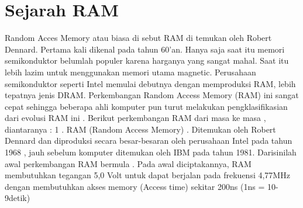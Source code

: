 \section{Sejarah RAM}
Random Acces Memory atau biasa di sebut RAM di temukan oleh Robert Dennard.
Pertama kali dikenal pada tahun 60'an. Hanya saja saat itu memori semikonduktor belumlah populer karena harganya yang sangat mahal. Saat itu lebih lazim untuk menggunakan memori utama magnetic. Perusahaan semikonduktor seperti Intel memulai debutnya dengan memproduksi RAM, lebih tepatnya jenis DRAM.
Perkembangan Random Access Memory (RAM) ini sangat cepat sehingga beberapa ahli komputer pun turut melakukan pengklasifikasian dari evolusi RAM ini . 
Berikut perkembangan RAM dari masa ke masa , diantaranya : 
1 . RAM (Random Access Memory) . Ditemukan oleh Robert Dennard dan diproduksi secara besar-besaran oleh perusahaan Intel pada tahun 1968 , 
jauh sebelum komputer ditemukan oleh IBM pada tahun 1981. Darisinilah awal perkembangan RAM bermula . Pada awal diciptakannya, 
RAM membutuhkan tegangan 5,0 Volt untuk dapat berjalan pada frekuensi 4,77MHz dengan membutuhkan akses memory (Access time) sekitar 200ns (1ns = 10-9detik) 
